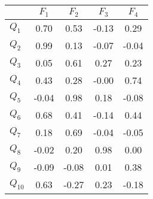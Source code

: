 \begin{tabular}{|l|c|c|c|c|}
\hline
&\textbf{$F_{1}$}&\textbf{$F_{2}$}&\textbf{$F_{3}$}&\textbf{$F_{4}$}\\\hline
\textbf{$Q_{1}$}&0.70&0.53&-0.13&0.29\\\hline
\textbf{$Q_{2}$}&0.99&0.13&-0.07&-0.04\\\hline
\textbf{$Q_{3}$}&0.05&0.61&0.27&0.23\\\hline
\textbf{$Q_{4}$}&0.43&0.28&-0.00&0.74\\\hline
\textbf{$Q_{5}$}&-0.04&0.98&0.18&-0.08\\\hline
\textbf{$Q_{6}$}&0.68&0.41&-0.14&0.44\\\hline
\textbf{$Q_{7}$}&0.18&0.69&-0.04&-0.05\\\hline
\textbf{$Q_{8}$}&-0.02&0.20&0.98&0.00\\\hline
\textbf{$Q_{9}$}&-0.09&-0.08&0.01&0.38\\\hline
\textbf{$Q_{10}$}&0.63&-0.27&0.23&-0.18\\\hline
\end{tabular}
